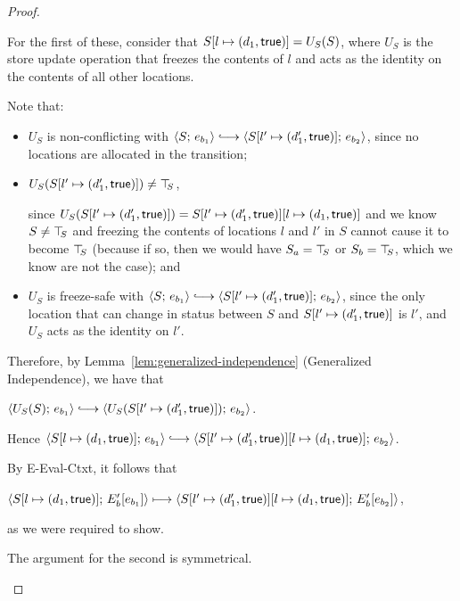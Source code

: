 \begin{proof}
\begin{enumerate}
\begin{enumerate}
\begin{itemize}
        For the first of these, consider that
        $S[l \mapsto (d_1, \textsf{true})] = U_S(S)$, where $U_S$ is the
        store update operation that freezes the contents of $l$
        and acts as the identity on the contents of all other
        locations.

        Note that:
        \begin{itemize}
        \item $U_S$ is non-conflicting with $\config{S}{e_{b_1}}
          \parstepsto
          \config{\extS{S}{l'}{d'_1}{\frozentrue}}{e_{b_2}}$, since
          no locations are allocated in the transition;
        \item $U_S(S[l' \mapsto (d'_1, \textsf{true})]) \neq \top\hspace{-0.85mm}_{S}$,

          since $U_S(S[l' \mapsto (d'_1, \textsf{true})]) =
          S[l' \mapsto (d'_1, \textsf{true})][l \mapsto (d_1, \textsf{true})]$
          and we know $S \neq \top\hspace{-0.85mm}_{S}$ and freezing the contents of
          locations $l$ and $l'$ in $S$ cannot cause it to become
          $\top\hspace{-0.85mm}_{S}$ (because if so, then we would have $S_a = \top\hspace{-0.85mm}_{S}$
          or $S_b = \top\hspace{-0.85mm}_{S}$, which we know are not the case); and
        \item $U_S$ is freeze-safe with $\config{S}{e_{b_1}}
          \parstepsto
          \config{\extS{S}{l'}{d'_1}{\frozentrue}}{e_{b_2}}$, since
          the only location that can change in status between $S$
          and $S[l' \mapsto (d'_1, \textsf{true})]$ is $l'$, and $U_S$
          acts as the identity on $l'$.
        \end{itemize}
        Therefore, by Lemma~\ref{lem:generalized-independence}
        (Generalized Independence), we have that

        $\config{U_S(S)}{e_{b_1}} \parstepsto
        \config{U_S(\extS{S}{l'}{d'_1}{\frozentrue})}{e_{b_2}}$.

        Hence $\config{\extS{S}{l}{d_1}{\frozentrue}}{e_{b_1}}
        \parstepsto
        \config{\extS{\extS{S}{l'}{d'_1}{\frozentrue}}{l}{d_1}{\frozentrue}}{e_{b_2}}$.

        By {\sc E-Eval-Ctxt}, it follows that

        $\langle S[l \mapsto (d_1, \textsf{true})];\, E'_b\hspace{-0.5mm}\left[e_{b_1}\right] \rangle
        \longmapsto
        \langle S[l' \mapsto (d'_1, \textsf{true})][l \mapsto (d_1, \textsf{true})];\, E'_b\hspace{-0.5mm}\left[e_{b_2}\right] \rangle$,
        
        as we were required to show.

        The argument for the second is symmetrical.


\end{itemize}
\end{enumerate}
\end{enumerate}
\end{proof}
